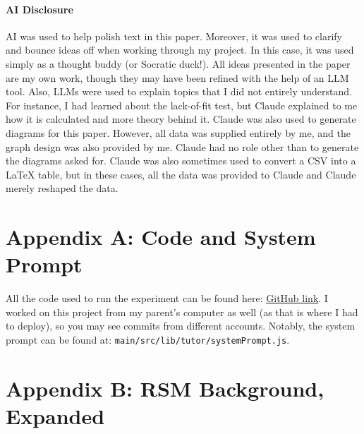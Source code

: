 \documentclass[12pt]{article}
\begin{document}
\newpage

\paragraph{AI Disclosure}

AI was used to help polish text in this paper. Moreover, it was used to clarify and bounce ideas off when working through my project. In this case, it was used simply as a thought buddy (or Socratic duck!). All ideas presented in the paper are my own work, though they may have been refined with the help of an LLM tool. Also, LLMs were used to explain topics that I did not entirely understand. For instance, I had learned about the lack-of-fit test, but Claude explained to me how it is calculated and more theory behind it.
Claude was also used to generate diagrams for this paper. However, all data was supplied entirely by me, and the graph design was also provided by me. Claude had no role other than to generate the diagrams asked for. Claude was also sometimes used to convert a CSV into a LaTeX table, but in these cases, all the data was provided to Claude and Claude merely reshaped the data.

\section{Appendix A: Code and System Prompt}

All the code used to run the experiment can be found here: \href{https://github.com/shivTHEmath/study-chat-app}{GitHub link}. I worked on this project from my parent's computer as well (as that is where I had to deploy), so you may see commits from different accounts. Notably, the system prompt can be found at: \texttt{main/src/lib/tutor/systemPrompt.js}.

\section{Appendix B: RSM Background, Expanded}
\end{document}
